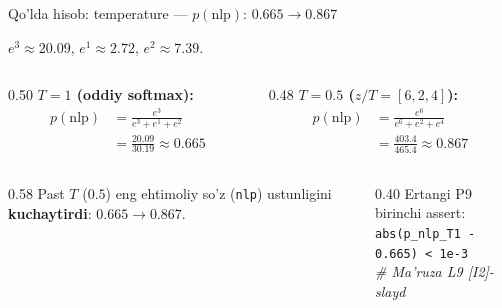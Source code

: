 \documentclass[aspectratio=169,11pt]{beamer}
\begin{document}
%
\begin{frame}{Qo'lda hisob: temperature --- $p(\text{nlp})$: $0.665 \to 0.867$}
  \begin{tcolorbox}[defbox,title={Logitlar $z=[3,1,2]$; vocab $=$ [nlp, foydali, qiziq]}]
    \small $e^3\approx 20.09$, \; $e^1\approx 2.72$, \; $e^2\approx 7.39$.
  \end{tcolorbox}
  \vspace{0.2em}
  \begin{columns}[T]
    \begin{column}{0.50\textwidth}
      \textbf{$T=1$ (oddiy softmax):}
      \begin{align*}
        p(\text{nlp}) &= \frac{e^3}{e^3+e^1+e^2}\\
          &= \frac{20.09}{30.19} \approx \mathbf{0.665}
      \end{align*}
    \end{column}
    \begin{column}{0.48\textwidth}
      \textbf{$T=0.5$ ($z/T=[6,2,4]$):}
      \begin{align*}
        p(\text{nlp}) &= \frac{e^6}{e^6+e^2+e^4}\\
          &= \frac{403.4}{465.4} \approx \mathbf{0.867}
      \end{align*}
    \end{column}
  \end{columns}
  \vspace{2pt}
  \begin{columns}[T]
    \begin{column}{0.58\textwidth}
      \footnotesize Past $T$ ($0.5$) eng ehtimoliy so'z (\texttt{nlp}) ustunligini
      \textbf{kuchaytirdi}: $0.665\to 0.867$.
    \end{column}
    \begin{column}{0.40\textwidth}
      \footnotesize\color{halfgray}
      Ertangi P9 birinchi assert:\\
      \texttt{abs(p\_nlp\_T1 - 0.665) < 1e-3}\\
      \textit{\# Ma'ruza L9 [I2]-slayd}
    \end{column}
  \end{columns}
\end{frame}
\end{document}
